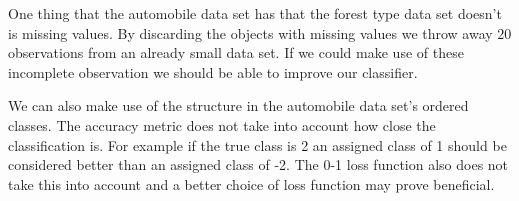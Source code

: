One thing that the automobile data set has that the forest type data set doesn't is missing values.
By discarding the objects with missing values we throw away $20$ observations from an already small data set.
If we could make use of these incomplete observation we should be able to improve our classifier.

We can also make use of the structure in the automobile data set's ordered classes.
The accuracy metric does not take into account how close the classification is.
For example if the true class is 2 an assigned class of 1 should be considered better than an assigned class of -2.
The 0-1 loss function also does not take this into account and a better choice of loss function may prove beneficial.

